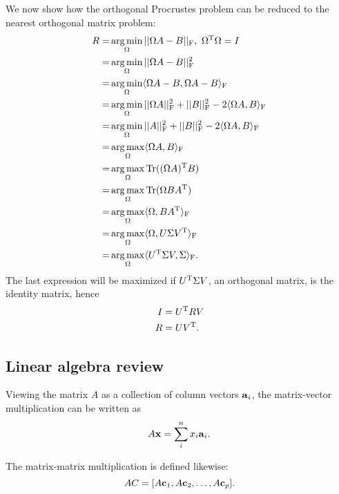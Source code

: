 \documentclass{article}
\begin{document}
We now show how the orthogonal Procrustes problem can be reduced to the nearest orthogonal matrix problem:
\begin{align}
R=&\argmin_{\Omega}||\Omega A-B||_{\mathrm{F}},\ \Omega^{\mathrm{T}}\Omega=I\\
=& \argmin_{\Omega}||\Omega A-B||^2_{\mathrm{F}}\\
=&\argmin_{\Omega}\bra \Omega A-B,\Omega A-B\ket_{\mathrm{F}}\\
=&\argmin_{\Omega}||\Omega A||^2_{\mathrm{F}} + ||B||^2_{\mathrm{F}}-2\bra \Omega A,B\ket_{\mathrm{F}}\\
=&\argmin_{\Omega}||A||^2_{\mathrm{F}} + ||B||^2_{\mathrm{F}}-2\bra \Omega A,B\ket_{\mathrm{F}}\\
=&\argmax_{\Omega}\bra \Omega A,B\ket_{\mathrm{F}}\\
=&\argmax_{\Omega}\Tr((\Omega A)\tp B)\\
=&\argmax_{\Omega}\Tr(\Omega BA\tp)\\
=&\argmax_{\Omega}\bra \Omega,BA\tp\ket_{\mathrm{F}}\\
=&\argmax_{\Omega}\bra \Omega,U\Sigma V\tp\ket_{\mathrm{F}}\\
=&\argmax_{\Omega}\bra U\tp\Sigma V,\Sigma\ket_{\mathrm{F}}.
\end{align}
The last expression will be maximized if $ U^{\text{T}}\Sigma V$, an orthogonal matrix, is the identity matrix, hence
\begin{align}
I&=U^{\text{T}} RV\\
R&=UV^{\text{T}}.
\end{align}

\subsection{Linear algebra review}
\begin{definition}
Viewing the matrix $A$ as a collection of column vectors $\bm{\mathrm{a}}_i$, the matrix-vector multiplication can be written as
    \begin{equation}
        A\bm{\mathrm{x}}=\sum_i^nx_i\bm{\mathrm{a}}_i.
    \end{equation}

    The matrix-matrix multiplication is defined likewise:
    \begin{equation}
        AC=[A\bm{\mathrm{c}}_1,A\bm{\mathrm{c}}_2,\dots,A\bm{\mathrm{c}}_p].
    \end{equation}
\end{definition}
\end{document}
